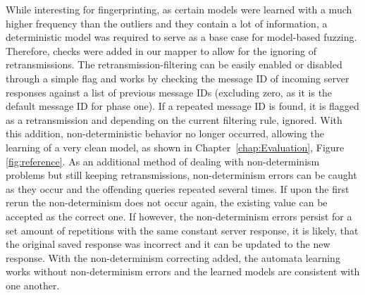While interesting for fingerprinting, as certain models were learned with a much higher frequency than the outliers and they contain a lot of information, a deterministic model was required to serve as a base case for model-based fuzzing. Therefore, checks were added in our mapper to allow for the ignoring of retransmissions. The retransmission-filtering can be easily enabled or disabled through a simple flag and works by checking the message ID of incoming server responses against a list of previous message IDs (excluding zero, as it is the default message ID for phase one). If a repeated message ID is found, it is flagged as a retransmission and depending on the current filtering rule, ignored. With this addition, non-deterministic behavior no longer occurred, allowing the learning of a very clean model, as shown in Chapter~\ref{chap:Evaluation}, Figure \ref{fig:reference}. As an additional method of dealing with non-determinism problems but still keeping retransmissions, non-determinism errors can be caught as they occur and the offending queries repeated several times. If upon the first rerun the non-determinism does not occur again, the existing value can be accepted as the correct one. If however, the non-determinism errors persist for a set amount of repetitions with the same constant server response, it is likely, that the original saved response was incorrect and it can be updated to the new response. With the non-determinism correcting added, the automata learning works without non-determinism errors and the learned models are consistent with one another.
